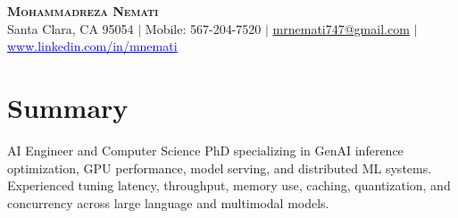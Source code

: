 \documentclass[letterpaper,13pt]{article}
\begin{document}
\begin{center}
    \textbf{\LARGE \scshape Mohammadreza Nemati} \\ \vspace{1pt}
    \small Santa Clara, CA 95054 $|$ Mobile: 567-204-7520 $|$
    \href{mailto:mrnemati747@gmail.com}{mrnemati747@gmail.com} $|$
    \href{https://www.linkedin.com/in/mnemati/}{\textcolor{blue}{\underline{www.linkedin.com/in/mnemati}}}
\end{center}

\section{Summary}
\small{AI Engineer and Computer Science PhD specializing in GenAI inference optimization, GPU performance, model serving, and distributed ML systems. Experienced tuning latency, throughput, memory use, caching, quantization, and concurrency across large language and multimodal models.}
\vspace{0.05cm}
\end{document}
